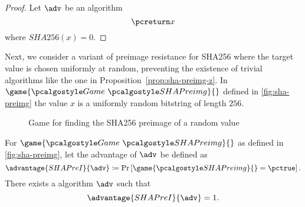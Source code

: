 \begin{proof}
  Let $\adv$ be an algorithm
  \[
   \pcreturn x
  \]
  where $SHA256(x) = 0$.
\end{proof}

Next, we consider a variant of preimage resistance for SHA256 where the target value is chosen uniformly at random, preventing the existence of trivial algorithms like the one in Proposition~\ref{prop:sha-preimg-z}.
In $\game{\Game~\algo{SHAPreimg}}{}$ defined in \autoref{fig:sha-preimg} the value $x$ is a uniformly random bitstring of length $256$.

\begin{figure}[tbhp]
  \begin{center}
    \begin{tcolorbox}[width=5cm]
      \begin{pchstack}[center]
      \end{pchstack}
    \end{tcolorbox}
  \end{center}
  \caption{Game for finding the SHA256 preimage of a random value \label{fig:sha-preimg}}
\end{figure}

\begin{proposition}
 For $\game{\Game~\algo{SHAPreimg}}{}$ as defined in \autoref{fig:sha-preimg}, let the advantage of $\adv$ be defined as
 \[
  \advantage{SHAPreI}{\adv} \defeq \pr{\game{\algo{SHAPreimg}}{} = \pctrue}.
 \]
 There exists a \ppt algorithm $\adv$ such that
 \[
 \advantage{SHAPreI}{\adv} = 1.
 \]
\end{proposition}

